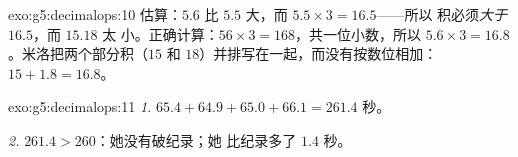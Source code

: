 \begin{solution}{exo:g5:decimalops:10}
估算：$5.6$ 比 $5.5$ 大，而 $5.5 \times 3 = 16.5$——所以
积必须\emph{大于} $16.5$，而 $15.18$ 太
小。正确计算：$56 \times 3 = 168$，共一位小数，所以
$5.6 \times 3 = 16.8$。米洛把两个部分积（$15$ 和
$18$）并排写在一起，而没有按数位相加：
$15 + 1.8 = 16.8$。
\end{solution}

\begin{solution}{exo:g5:decimalops:11}
\emph{1.} $65.4 + 64.9 + 65.0 + 66.1 = 261.4$ 秒。

\emph{2.} $261.4 > 260$：她没有破纪录；她
比纪录多了 $1.4$ 秒。
\end{solution}

